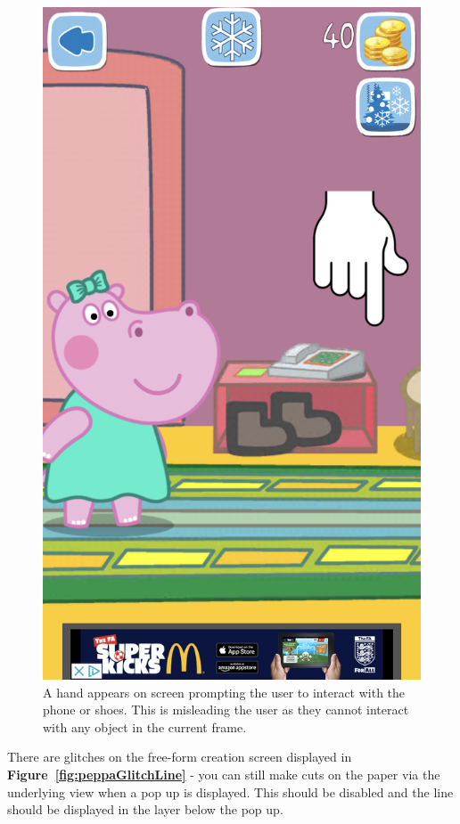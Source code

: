 \documentclass[11pt]{article}
\begin{document}
\begin{figure}[!ht]
\begin{minipage}{0.32\textwidth}
                            \includegraphics[width=0.8\linewidth]{Images/peppa/peppaGlitchPoint.PNG}
                             \caption{A hand appears on screen prompting the user to interact with the phone or shoes. This is misleading the user as they cannot interact with any object in the current frame.}
                            \label{fig:peppaGlitchPoint}
                        \end{minipage}
                    \end{figure}
                    
                    There are glitches on the free-form creation screen displayed in \textbf{Figure~\ref{fig:peppaGlitchLine}} - you can still make cuts on the paper via the underlying view when a pop up is displayed. This should be disabled and the line should be displayed in the layer below the pop up.
                
\end{document}
